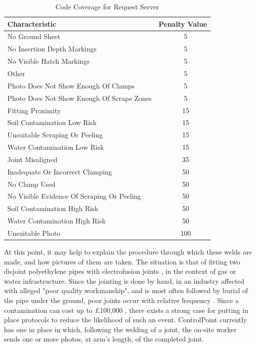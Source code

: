 \documentclass[a4paper,11pt]{article}
\begin{document}
\begin{table}[h]
   \centering
    \begin{tabular}{|l|c|}
    \hline
    Characteristic                 & Penalty Value  \\ \hline
    No Ground Sheet  & ~  5 \\
    No Insertion Depth Markings  & ~ 5 \\
    No Visible Hatch Markings  & ~ 5 \\
    Other  & ~  5 \\
    Photo Does Not Show Enough Of Clamps  & ~ 5 \\
    Photo Does Not Show Enough Of Scrape Zones  & ~ 5 \\
    Fitting Proximity  & ~  15 \\
    Soil Contamination Low Risk  & ~ 15 \\
    Unsuitable Scraping Or Peeling  & ~ 15 \\
    Water Contamination Low Risk  & ~ 15 \\
    Joint Misaligned  & ~  35 \\
    Inadequate Or Incorrect Clamping  & ~ 50 \\
    No Clamp Used  & ~  50 \\
    No Visible Evidence Of Scraping Or Peeling  & ~ 50 \\
    Soil Contamination High Risk  & ~ 50 \\
    Water Contamination High Risk  & ~ 50 \\
    Unsuitable Photo  & ~ 100 \\
    \hline
    \end{tabular}
    \caption {Code Coverage for Request Server}
\end{table} 

At this point, it may help to explain the procedure through which these welds are made, and how pictures of them are taken. The situation is that of fitting two disjoint polyethylene pipes with electrofusion joints \cite{control-point}, in the context of gas or water infrastructure. Since the jointing is done by hand, in an industry affected with alleged "poor quality workmanship", and is most often followed by burial of the pipe under the ground, poor joints occur with relative frequency \cite{control-point}. Since a contamination can cost up to £100,000 \cite{control-point}, there exists a strong case for putting in place protocols to reduce the likelihood of such an event. ControlPoint currently has one in place in which, following the welding of a joint, the on-site worker sends one or more photos, at arm's length, of the completed joint. 
\end{document}
